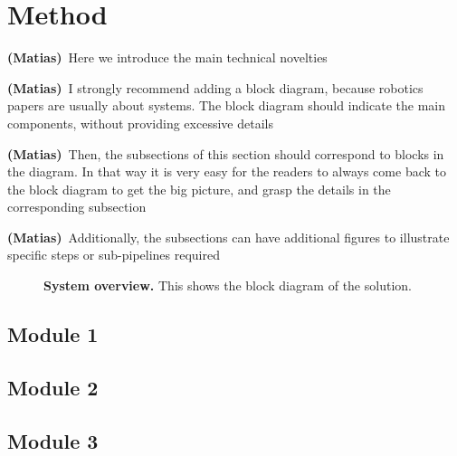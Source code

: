 \documentclass[letterpaper, 10 pt, conference]{ieeeconf}
\newcommand{\matias}[1]{\textcolor{RubineRed}{\textbf{(Matias)}~#1}}
\begin{document}
\textcolor{Gray}{\lipsum[1]}

\section{Method}
\matias{Here we introduce the main technical novelties}

\matias{I strongly recommend adding a block diagram, because robotics papers are usually about systems. The block diagram should indicate the main components, without providing excessive details}

\matias{Then, the subsections of this section should correspond to blocks in the diagram. In that way it is very easy for the readers to always come back to the block diagram to get the big picture, and grasp the details in the corresponding subsection}

\matias{Additionally, the subsections can have additional figures to illustrate specific steps or sub-pipelines required}

\begin{figure}[h]
  \centering
  \caption{\textbf{System overview.} This shows the block diagram of the solution.}
  \label{fig:system-overview}
\end{figure}

\textcolor{Gray}{\lipsum[1-2]}

\subsection{Module 1}

\textcolor{Gray}{\lipsum[1-2]}

\subsection{Module 2}

\textcolor{Gray}{\lipsum[1-2]}

\subsection{Module 3}

\textcolor{Gray}{\lipsum[1-2]}
\end{document}
